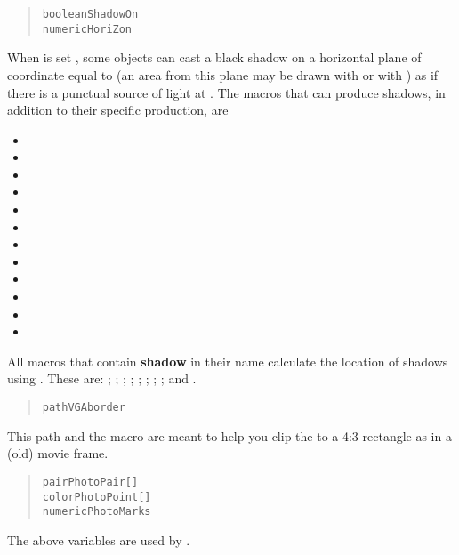 \begin{quote}
\begin{alltt}
boolean ShadowOn
numeric HoriZon
\end{alltt}
\end{quote}
When  is set , some objects can
cast a black shadow on a horizontal plane of 
coordinate equal to  (an area from
this plane may be drawn with  or with
) as if there is a punctual source of light at
.
The macros that can produce shadows, in addition to their
specific production, are
\begin{itemize}
\item {}
\item {}
\item {}
\item {}
\item {}
\item {}
\item {}
\item {}
\item {}
\item {}
\item {}
\item {}
\end{itemize}
All macros that contain {\bfseries shadow} in their name
calculate the location of shadows using . These are:
;
;
;
;
;
;
;
; and
.
\begin{quote}
\begin{alltt}
path VGAborder
\end{alltt}
\end{quote}
This path and the macro  are
meant to help you clip the  to a 4:3
rectangle as in a (old) movie frame.

\begin{quote}
\begin{alltt}
pair PhotoPair[]
color PhotoPoint[]
numeric PhotoMarks
\end{alltt}
\end{quote}
The above variables are used by .

